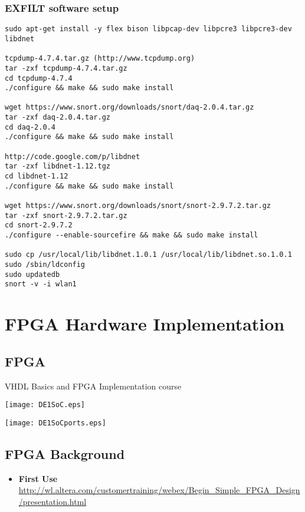 \documentclass[dvipdfm]{book}
\begin{document}
\subsection{EXFILT software setup}
\begin{verbatim}
sudo apt-get install -y flex bison libpcap-dev libpcre3 libpcre3-dev libdnet

tcpdump-4.7.4.tar.gz (http://www.tcpdump.org)
tar -zxf tcpdump-4.7.4.tar.gz
cd tcpdump-4.7.4
./configure && make && sudo make install

wget https://www.snort.org/downloads/snort/daq-2.0.4.tar.gz
tar -zxf daq-2.0.4.tar.gz
cd daq-2.0.4
./configure && make && sudo make install

http://code.google.com/p/libdnet
tar -zxf libdnet-1.12.tgz
cd libdnet-1.12
./configure && make && sudo make install

wget https://www.snort.org/downloads/snort/snort-2.9.7.2.tar.gz
tar -zxf snort-2.9.7.2.tar.gz
cd snort-2.9.7.2
./configure --enable-sourcefire && make && sudo make install

sudo cp /usr/local/lib/libdnet.1.0.1 /usr/local/lib/libdnet.so.1.0.1
sudo /sbin/ldconfig
sudo updatedb
snort -v -i wlan1

\end{verbatim}


\chapter{FPGA Hardware Implementation}
\section{FPGA}
VHDL Basics and FPGA Implementation course

\begin{center}
\texttt{[image: DE1SoC.eps]}
\vskip 0.1in
\end{center}

\begin{center}
\texttt{[image: DE1SoCports.eps]}
\vskip 0.1in
\end{center}

\section{FPGA Background}
\begin{itemize}
\item {\bf First Use}
\url{http://wl.altera.com/customertraining/webex/Begin_Simple_FPGA_Design/presentation.html}
\end{itemize}
\end{document}
